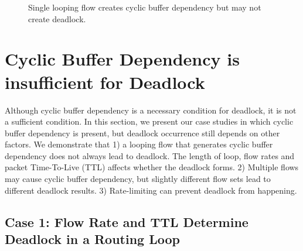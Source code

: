 \begin{figure}[t]
\centering
{}
\vspace{-0.15in}
\caption{Single looping flow creates cyclic buffer dependency but may not create deadlock.}
\vspace{-0.15in}
\label{fig:loop}
\end{figure}

\secspace
\section{Cyclic Buffer Dependency is insufficient for Deadlock}
\label{sec:analysis}
\secspace

Although cyclic buffer dependency is a necessary condition for deadlock, it is not a
sufficient condition. In this section, we present our case studies in which cyclic 
buffer dependency is present, but deadlock occurrence still depends on other factors. We demonstrate 
that 1) a looping flow that generates cyclic buffer dependency does not always lead to deadlock. 
The length of loop, flow rates and packet Time-To-Live (TTL) affects whether 
the deadlock forms. 2) Multiple flows may cause cyclic buffer dependency,
but slightly different flow sets lead to different deadlock results. 3) Rate-limiting can
prevent deadlock from happening.

\secspace
\subsection{Case 1: Flow Rate and TTL Determine Deadlock in a Routing Loop}
\secspace

